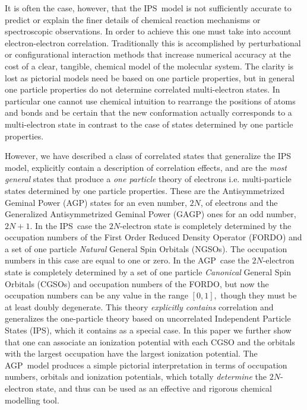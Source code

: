 \documentclass[aps,preprint]{revtex4}%
\begin{document}
It is often the case, however, that the IPS\ model is not sufficiently
accurate to predict or explain the finer details of chemical reaction
mechanisms or spectroscopic observations. In order to achieve this one must
take into account electron-electron correlation. Traditionally this is
accomplished by perturbational or configurational interaction methods that
increase numerical accuracy at the cost of a clear, tangible, chemical model
of the molecular system. The clarity is lost as pictorial models need be based
on one particle properties, but in general one particle properties do not
determine correlated multi-electron states. In particular one cannot use
chemical intuition to rearrange the positions of atoms and bonds and be
certain that the new conformation actually corresponds to a multi-electron
state in contrast to the case of states determined by one particle properties.

However, we have described \cite{Weiner & Ortiz 2003} a class of correlated
states that generalize the IPS model, explicitly contain a description of
correlation effects, and are the \emph{most general} states that produce a
\emph{one particle} theory of electrons i.e. multi-particle states determined
by one particle properties. These are the Antisymmetrized Geminal Power (AGP)
states for an even number, $2N$, of electrons and the Generalized
Antisymmetrized Geminal Power (GAGP) ones for an odd number, $2N+1$. In the
IPS\ case the $2N$-electron state is completely determined by the occupation
numbers of the First Order Reduced Density Operator (FORDO) and a set of one
particle \emph{Natural }General Spin Orbitals (NGSOs). The occupation numbers
in this case are equal to one or zero. In the AGP\ case the $2N$-electron
state is completely determined by a set of one particle \emph{Canonical
}General Spin Orbitals (CGSOs) and occupation numbers of the FORDO, but now
the occupation numbers can be any value in the range $\left[  0,1\right]  ,$
though they must be at least doubly degenerate. This theory \emph{explicitly
contains} correlation and generalizes the one-particle theory based on
uncorrelated Independent Particle States (IPS), which it contains as a special
case. In this paper we further show that one can associate an ionization
potential with each CGSO and the orbitals with the largest occupation have the
largest ionization potential. The AGP\ model produces a simple pictorial
interpretation in terms of occupation numbers, orbitals and ionization
potentials, which totally \emph{determine} the $2N$-electron state, and thus
can be used as an effective and rigorous chemical modelling tool.
\end{document}
